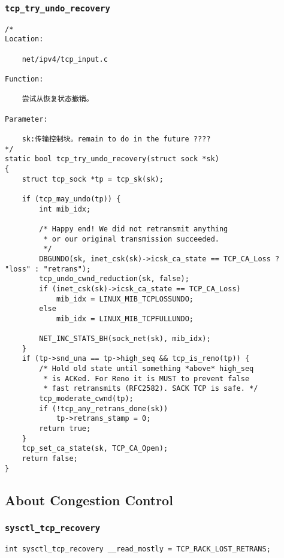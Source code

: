 		\subsubsection{\texttt{tcp_try_undo_recovery}}
\begin{verbatim}
/* 
Location:

	net/ipv4/tcp_input.c

Function:

	尝试从恢复状态撤销。

Parameter:

	sk:传输控制块。remain to do in the future ????
*/
static bool tcp_try_undo_recovery(struct sock *sk)
{
	struct tcp_sock *tp = tcp_sk(sk);

	if (tcp_may_undo(tp)) {
		int mib_idx;

		/* Happy end! We did not retransmit anything
		 * or our original transmission succeeded.
		 */
		DBGUNDO(sk, inet_csk(sk)->icsk_ca_state == TCP_CA_Loss ? "loss" : "retrans");
		tcp_undo_cwnd_reduction(sk, false);
		if (inet_csk(sk)->icsk_ca_state == TCP_CA_Loss)
			mib_idx = LINUX_MIB_TCPLOSSUNDO;
		else
			mib_idx = LINUX_MIB_TCPFULLUNDO;

		NET_INC_STATS_BH(sock_net(sk), mib_idx);
	}
	if (tp->snd_una == tp->high_seq && tcp_is_reno(tp)) {
		/* Hold old state until something *above* high_seq
		 * is ACKed. For Reno it is MUST to prevent false
		 * fast retransmits (RFC2582). SACK TCP is safe. */
		tcp_moderate_cwnd(tp);
		if (!tcp_any_retrans_done(sk))
			tp->retrans_stamp = 0;
		return true;
	}
	tcp_set_ca_state(sk, TCP_CA_Open);
	return false;
}
\end{verbatim}
	\subsection{About Congestion Control}
		\subsubsection{\texttt{sysctl_tcp_recovery}}
\begin{verbatim}
int sysctl_tcp_recovery __read_mostly = TCP_RACK_LOST_RETRANS;
\end{verbatim}
